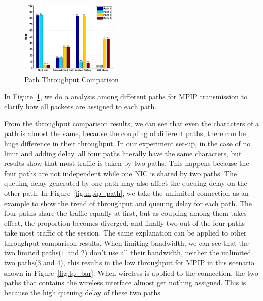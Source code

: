 \begin{figure}
\centering
\includegraphics[width=0.8\linewidth,height=1.4in]{fig/path_tp_bar.eps}
\caption{Path Throughput Comparison}
\label{fig.path_tp_bar}
\end{figure}




In Figure~\ref{fig.path_tp_bar}, we do a analysis among different paths for MPIP transmission to clarify how all packets are assigned to each path. 

From the throughput comparison results, we can see that even the characters of a path is almost the same, because the coupling of different paths, there can be huge difference in their throughput. In our experiment set-up, in the case of no limit and adding delay, all four paths literally have the same characters, but results show that most traffic is taken by two paths. This happens because the four paths are not independent while one NIC is shared by two paths. The queuing delay generated by one path may also affect the queuing delay on the other path. In Figure~\ref{fig.mpip_path}, we take the unlimited connection as an example to show the trend of throughput and queuing delay for each path. The four paths share the traffic equally at first, but as coupling among them takes effect, the proportion becomes diverged, and finally two out of the four paths take most traffic of the session.
The same explanation can be applied to other throughput comparison results. When limiting bandwidth, we can see that the two limited paths($1$ and $2$) don't use all their bandwidth, neither the unlimited two paths($3$ and $4$), this results in the low throughput for MPIP in this scenario shown in Figure~\ref{fig.tp_bar}. When wireless is applied to the connection, the two paths that contains the wireless interface almost get nothing assigned. This is because the high queuing delay of these two paths.

